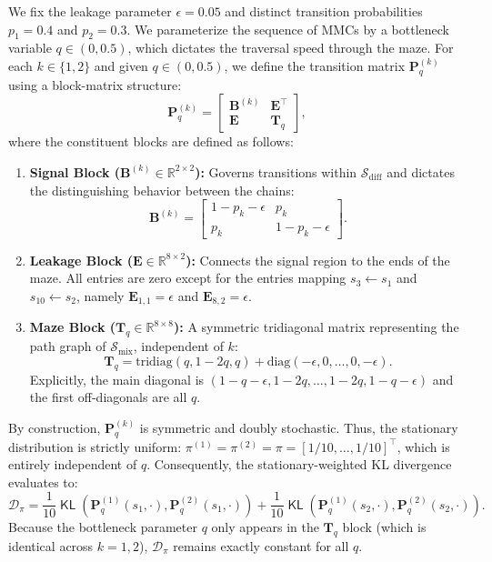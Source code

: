 \documentclass[twoside]{article}
\DeclareMathOperator{\KL}{{\mathsf{KL}}}
\def\mB{{\bm{B}}}
\def\mE{{\bm{E}}}
\def\mP{{\bm{P}}}
\def\mT{{\bm{T}}}
\def\gD{{\mathcal{D}}}
\def\gS{{\mathcal{S}}}
\def\sR{{\mathbb{R}}}
\theoremstyle{plain}
\begin{document}
We fix the leakage parameter $\epsilon = 0.05$ and distinct transition probabilities $p_1 = 0.4$ and $p_2 = 0.3$. 
We parameterize the sequence of MMCs by a bottleneck variable $q \in (0, 0.5)$, which dictates the traversal speed through the maze.
For each $k \in \{1, 2\}$ and given $q \in (0, 0.5)$, we define the transition matrix $\mP^{(k)}_q$ using a block-matrix structure:
\begin{equation*}
    \mP^{(k)}_q = \begin{bmatrix}
        \mB^{(k)} & \mE^\top \\
        \mE & \mT_q
    \end{bmatrix},
\end{equation*}
where the constituent blocks are defined as follows:
\begin{enumerate}
    \item \textbf{Signal Block ($\mB^{(k)} \in \sR^{2 \times 2}$):} Governs transitions within $\gS_{\text{diff}}$ and dictates the distinguishing behavior between the chains:
    \begin{equation*}
        \mB^{(k)} = \begin{bmatrix}
            1 - p_k - \epsilon & p_k \\
            p_k & 1 - p_k - \epsilon
        \end{bmatrix}.
    \end{equation*}
    \item \textbf{Leakage Block ($\mE \in \sR^{8 \times 2}$):} Connects the signal region to the ends of the maze. All entries are zero except for the entries mapping $s_3 \leftarrow s_1$ and $s_{10} \leftarrow s_2$, namely $\mE_{1,1} = \epsilon$ and $\mE_{8,2} = \epsilon$.
    
    \item \textbf{Maze Block ($\mT_q \in \sR^{8 \times 8}$):} A symmetric tridiagonal matrix representing the path graph of $\gS_{\text{mix}}$, independent of $k$:
    \begin{equation*}
        \mT_q = \text{tridiag}(q, 1-2q, q) + \text{diag}(-\epsilon, 0, \dots, 0, -\epsilon).
    \end{equation*}
    Explicitly, the main diagonal is $(1-q-\epsilon, 1-2q, \dots, 1-2q, 1-q-\epsilon)$ and the first off-diagonals are all $q$.
\end{enumerate}

By construction, $\mP^{(k)}_q$ is symmetric and doubly stochastic. Thus, the stationary distribution is strictly uniform: $\pi^{(1)} = \pi^{(2)} = \pi = [1/10, \dots, 1/10]^\top$, which is entirely independent of $q$.
Consequently, the stationary-weighted KL divergence evaluates to:
\begin{equation*}
    \gD_\pi = \frac{1}{10} \KL\left(\mP^{(1)}_q(s_1, \cdot), \mP^{(2)}_q(s_1, \cdot)\right) + \frac{1}{10} \KL\left(\mP^{(1)}_q(s_2, \cdot), \mP^{(2)}_q(s_2, \cdot)\right).
\end{equation*}
Because the bottleneck parameter $q$ only appears in the $\mT_q$ block (which is identical across $k=1, 2$), $\gD_\pi$ remains exactly constant for all $q$. 
\end{document}

